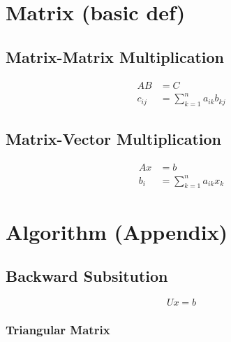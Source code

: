 \documentclass[11pt]{article}
\begin{document}
\newpage

\section{Matrix (basic def)}

\subsection*{Matrix-Matrix Multiplication}
\begin{align}
    AB &= C \\
    c_{ij} &= \sum_{k=1}^{n} a_{ik} b_{kj}
\end{align}

\subsection*{Matrix-Vector Multiplication}
\begin{align}
    Ax &= b \\
    b_{i} &= \sum_{k=1}^{n} a_{ik} x_{k}
\end{align}


\newpage
\section{Algorithm (Appendix)}

\subsection*{Backward Subsitution}

\begin{equation}
    Ux = b
\end{equation}


\subsubsection*{Triangular Matrix}
\end{document}
